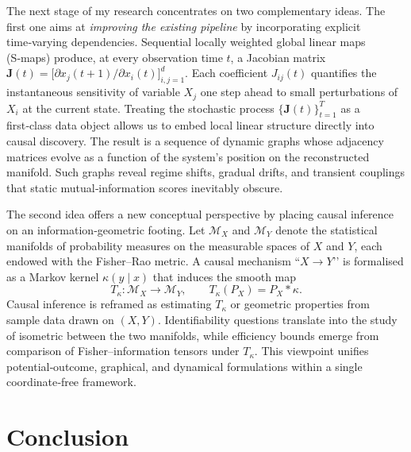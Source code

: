 \documentclass[14pt]{extarticle}
\begin{document}
	The next stage of my research concentrates on two complementary ideas.  
	The first one aims at \emph{improving the existing pipeline} by incorporating explicit time‑varying dependencies.  
	Sequential locally weighted global linear maps (S‑maps) produce, at every observation time $t$, a Jacobian matrix $\mathbf J(t)=\bigl[\partial x_j(t+1)\!/\!\partial x_i(t)\bigr]_{i,j=1}^{d}$.  
	Each coefficient $J_{ij}(t)$ quantifies the instantaneous sensitivity of variable $X_j$ one step ahead to small perturbations of $X_i$ at the current state.  
	Treating the stochastic process $\{\mathbf J(t)\}_{t=1}^{T}$ as a first‑class data object allows us to embed local linear structure directly into causal discovery.   
	The result is a sequence of dynamic graphs whose adjacency matrices evolve as a function of the system’s position on the reconstructed manifold.  
	Such graphs reveal regime shifts, gradual drifts, and transient couplings that static mutual‑information scores inevitably obscure.  
	
	The second idea offers a new conceptual perspective by placing causal inference on an information‑geometric footing.  
	Let $\mathcal M_X$ and $\mathcal M_Y$ denote the statistical manifolds of probability measures on the measurable spaces of $X$ and $Y$, each endowed with the Fisher–Rao metric.  
	A causal mechanism “$X\!\rightarrow\!Y$’’ is formalised as a Markov kernel $\kappa(y\!\mid\!x)$ that induces the smooth map
	$$
	T_\kappa:\mathcal M_X\longrightarrow\mathcal M_Y,\qquad T_\kappa(P_X)=P_X\ast\kappa.
	$$
	Causal inference is reframed as estimating $T_\kappa$ or geometric properties from sample data drawn on $(X,Y)$.  
	Identifiability questions translate into the study of isometric between the two manifolds, while efficiency bounds emerge from comparison of Fisher–information tensors under $T_\kappa$.  
	This viewpoint unifies potential‑outcome, graphical, and dynamical formulations within a single coordinate‑free framework.  
	
	\section{Conclusion}\label{sec:conclusion}
	
\end{document}
